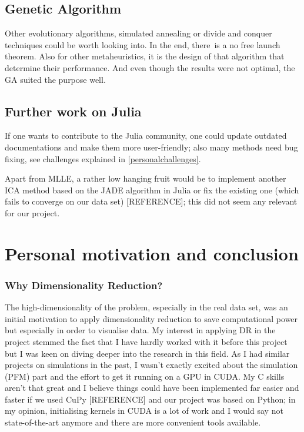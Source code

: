 \documentclass[journal, a4paper]{IEEEtran}
\begin{document}
\subsection{Genetic Algorithm}

Other evolutionary algorithms, simulated annealing or divide and conquer techniques could be worth looking into. In the end, there is a no free launch theorem. Also for other metaheuristics, it is the design of that algorithm that determine their performance. And even though the results were not optimal, the GA suited the purpose well.


\subsection{Further work on Julia}

If one wants to contribute to the Julia community, one could update outdated documentations and make them more user-friendly; also many methods need bug fixing, see challenges explained in \ref{personalchallenges}. 

Apart from MLLE, a rather low hanging fruit would be to implement another ICA method based on the JADE algorithm in Julia or fix the existing one (which fails to converge on our data set) [REFERENCE]; this did not seem any relevant for our project.


\section{Personal motivation and conclusion}

\subsubsection{Why Dimensionality Reduction?}
The high-dimensionality of the problem, especially in the real data set, was an initial motivation to apply dimensionality reduction to save computational power but especially in order to visualise data. %
My interest in applying DR in the project stemmed the fact that I have hardly worked with it before this project but I was keen on diving deeper into the research in this field. As I had similar projects on simulations in the past, I wasn’t exactly excited about the simulation (PFM) part and the effort to get it running on a GPU in CUDA. My C skills aren’t that great and I believe things could have been implemented far easier and faster if we used CuPy [REFERENCE] and our project was based on Python; in my opinion, initialising kernels in CUDA is a lot of work and I would say not state-of-the-art anymore and there are more convenient tools available. 
\end{document}
